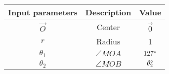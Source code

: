    \begin{tabular}{|c|c|c|}
    \hline
         \textbf{Input parameters}& \textbf{Description}&\textbf{Value} \\
         \hline
        $\vec{O}$ & Center&$\vec{0}$ \\
        \hline
        $r$&Radius &1\\
        \hline
        $\theta_1$ &$\angle MOA$&$127\degree$\\
        \hline
       $\theta_2$ &$\angle MOB$&$\theta_2\degree$\\
        \hline
     
    \end{tabular}
